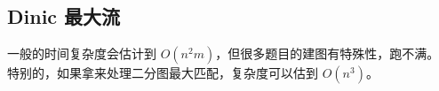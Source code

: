 \subsection{Dinic 最大流}

一般的时间复杂度会估计到 $O(n^2 m)$，但很多题目的建图有特殊性，跑不满。
特别的，如果拿来处理二分图最大匹配，复杂度可以估到 $O(n^3)$。

